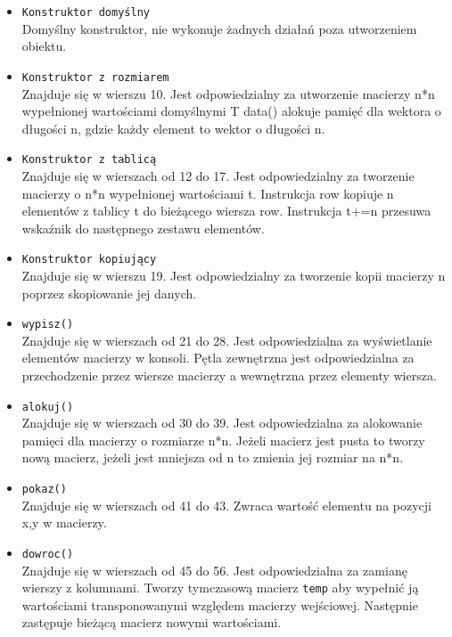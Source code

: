\begin{itemize}
	\item \texttt{Konstruktor domyślny}\\
	Domyślny konstruktor, nie wykonuje żadnych działań poza utworzeniem obiektu.
	
	\item \texttt{Konstruktor z rozmiarem}\\
	Znajduje się w wierszu 10. Jest odpowiedzialny za utworzenie macierzy n*n wypełnionej wartościami domyślnymi T data() alokuje pamięć dla wektora o długości n, gdzie każdy element to wektor o długości n.
	
	\item \texttt{Konstruktor z tablicą}\\
	Znajduje się w wierszach od 12 do 17. Jest odpowiedzialny za tworzenie macierzy o n*n wypełnionej wartościami t. Instrukcja row kopiuje n elementów z tablicy t do bieżącego wiersza row. Instrukcja t+=n przesuwa wskaźnik do następnego zestawu elementów.
	
	\item \texttt{Konstruktor kopiujący}\\
	Znajduje się w wierszu 19. Jest odpowiedzialny za tworzenie kopii macierzy n poprzez skopiowanie jej danych.
	
    \item \texttt{wypisz()}\\
    Znajduje się w wierszach od 21 do 28.
    Jest odpowiedzialna za wyświetlanie elementów macierzy w konsoli. Pętla zewnętrzna jest odpowiedzialna za przechodzenie przez wiersze macierzy a wewnętrzna przez elementy wiersza.

    \item \texttt{alokuj()}\\
    Znajduje się w wierszach od 30 do 39.
    Jest odpowiedzialna za alokowanie pamięci dla macierzy o rozmiarze n*n. Jeżeli macierz jest pusta to tworzy nową macierz, jeżeli jest mniejsza od n to zmienia jej rozmiar na n*n.

    \item \texttt{pokaz()}\\
    Znajduje się w wierszach od 41 do 43.
    Zwraca wartość elementu na pozycji x,y w macierzy.

    \item \texttt{dowroc()}\\
    Znajduje się w wierszach od 45 do 56.
    Jest odpowiedzialna za zamianę wierszy z kolumnami. Tworzy tymczasową macierz \texttt{temp} aby wypełnić ją wartościami transponowanymi względem macierzy wejściowej. Następnie zastępuje bieżącą macierz nowymi wartościami.


\end{itemize}
